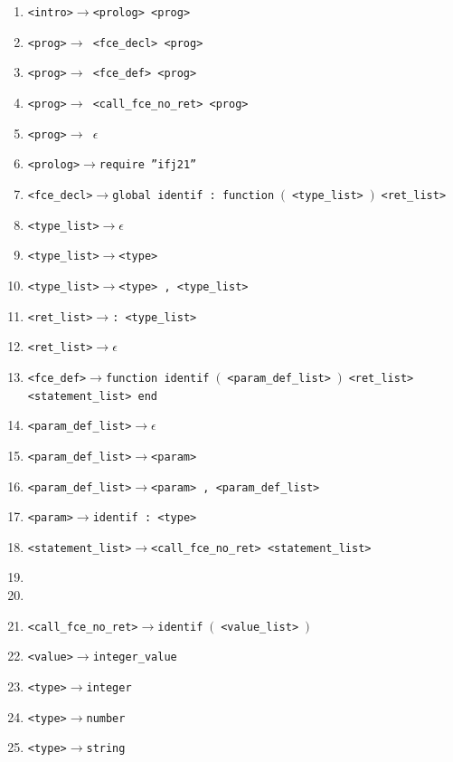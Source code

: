 \documentclass[11pt]{article}
\newcommand{\term}[1]{{\color{red}#1}}
\newcommand{\arrow}{$\rightarrow$}
\begin{document}
\begin{enumerate}
    {\color{red}}
    \item \texttt{<intro>\arrow{}<prolog> <prog> }  
    \item \texttt{<prog>\arrow{} <fce\_decl> <prog>}
    \item \texttt{<prog>\arrow{} <fce\_def> <prog>}
    \item \texttt{<prog>\arrow{} <call\_fce\_no\_ret> <prog>}
    \item \texttt{<prog>\arrow{} $\epsilon$}    
    \item \texttt{<prolog>\arrow{}\term{require} \term{''ifj21''}   }
    \item \texttt{<fce\_decl>\arrow{}\term{global} \term{identif} \term{:} \term{function} \term{$($} <type\_list> \term{$)$} <ret\_list>}
    \item \texttt{<type\_list>\arrow{}$\epsilon$}
    \item \texttt{<type\_list>\arrow{}<type>}
    \item \texttt{<type\_list>\arrow{}<type> \term{,} <type\_list>} 
    \item \texttt{<ret\_list>\arrow{}\term{:} <type\_list>}
    \item \texttt{<ret\_list>\arrow{}$\epsilon$}
    \item \texttt{<fce\_def>\arrow{}\term{function} \term{identif} \term{$($} <param\_def\_list> \term{$)$} <ret\_list> <statement\_list> \term{end}}
    \item \texttt{<param\_def\_list>\arrow{}$\epsilon$}
    \item \texttt{<param\_def\_list>\arrow{}<param>}
    \item \texttt{<param\_def\_list>\arrow{}<param> \term{,} <param\_def\_list>} 
    \item \texttt{<param>\arrow{}\term{identif} \term{:} <type>}   
    \item \texttt{<statement\_list>\arrow{}<call\_fce\_no\_ret> <statement\_list>}
    \item \texttt{}
    \item \texttt{}
    \item \texttt{<call\_fce\_no\_ret>\arrow{}\term{identif} \term{$($} <value\_list> \term{$)$}}
    \item \texttt{<value>\arrow{\term{integer\_value}}}



    \item \texttt{<type>\arrow{}\term{integer}}
    \item \texttt{<type>\arrow{}\term{number}}
    \item \texttt{<type>\arrow{}\term{string}}
\end{enumerate}
\end{document}
